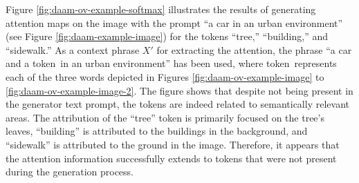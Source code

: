Figure \ref{fig:daam-ov-example-softmax} illustrates the results of generating attention maps on the image with the prompt ``a car in an urban environment'' (see Figure \ref{fig:daam-example-image}) for the tokens ``tree,'' ``building,'' and ``sidewalk.'' As a context phrase $X'$ for extracting the attention, the phrase ``a car and a \textlangle token\textrangle\ in an urban environment'' has been used, where \textlangle token\textrangle\ represents each of the three words depicted in Figures \ref{fig:daam-ov-example-image} to \ref{fig:daam-ov-example-image-2}. The figure shows that despite not being present in the generator text prompt, the tokens are indeed related to semantically relevant areas. The attribution of the ``tree'' token is primarily focused on the tree's leaves, ``building'' is attributed to the buildings in the background, and ``sidewalk'' is attributed to the ground in the image. Therefore, it appears that the attention information successfully extends to tokens that were not present during the generation process.



